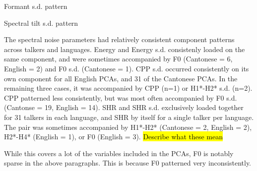 Formant s.d. pattern

Spectral tilt s.d. pattern 

The spectral noise parameters had relatively consistent component patterns across talkers and languages. Energy and Energy s.d. consistenly loaded on the same component, and were sometimes accompanied by F0 (Cantonese = 6, English = 2) and F0 s.d. (Cantonese = 1). CPP s.d. occurred consistently on its own component for all English PCAs, and 31 of the Cantonese PCAs. In the remaining three cases, it was accompanied by CPP (n=1) or H1*-H2* s.d. (n=2). CPP patterned less consistently, but was most often accompanied by F0 s.d. (Cantonse = 19, English = 14). SHR and SHR s.d. exclusively loaded together for 31 talkers in each language, and SHR by itself for a single talker per language. The pair was sometimes accompanied by H1*-H2* (Cantonese = 2, English = 2), H2*-H4* (English = 1), or F0 (English = 3). \hl{Describe what these mean}


While this covers a lot of the variables included in the PCAs, F0 is notably sparse in the above paragraphs. This is because F0 patterned very inconsistently.




